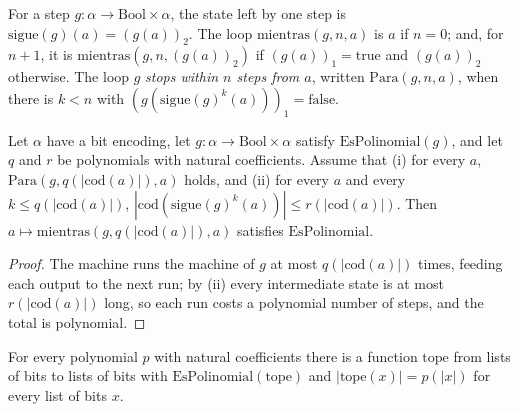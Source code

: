 \begin{definition}
  \label{def:machines-while}
  \leanok
  For a step $g : \alpha \to \mathrm{Bool} \times \alpha$, the state left by one step is
  $\mathrm{sigue}(g)(a) = (g(a))_2$. The loop $\mathrm{mientras}(g, n, a)$ is $a$ if $n = 0$; and, for
  $n + 1$, it is $\mathrm{mientras}(g, n, (g(a))_2)$ if $(g(a))_1 = \mathrm{true}$ and $(g(a))_2$ otherwise.
  The loop $g$ \emph{stops within $n$ steps from $a$}, written $\mathrm{Para}(g, n, a)$, when there is
  $k < n$ with $(g(\mathrm{sigue}(g)^k(a)))_1 = \mathrm{false}$.
  \own{}
  \infrastructure{}
\end{definition}

\begin{theorem}
  \label{thm:machines-while}
  \leanok
  Let $\alpha$ have a bit encoding, let $g : \alpha \to \mathrm{Bool} \times \alpha$ satisfy
  $\mathrm{EsPolinomial}(g)$, and let $q$ and $r$ be polynomials with natural coefficients. Assume that
  (i) for every $a$, $\mathrm{Para}(g, q(|\mathrm{cod}(a)|), a)$ holds, and (ii) for every $a$ and every
  $k \le q(|\mathrm{cod}(a)|)$, $|\mathrm{cod}(\mathrm{sigue}(g)^k(a))| \le r(|\mathrm{cod}(a)|)$. Then
  $a \mapsto \mathrm{mientras}(g, q(|\mathrm{cod}(a)|), a)$ satisfies $\mathrm{EsPolinomial}$.
  \own{}
  \infrastructure{}
\end{theorem}

\begin{proof}
  \leanok
  The machine runs the machine of $g$ at most $q(|\mathrm{cod}(a)|)$ times, feeding each output to the next
  run; by (ii) every intermediate state is at most $r(|\mathrm{cod}(a)|)$ long, so each run costs a
  polynomial number of steps, and the total is polynomial.
\end{proof}

\begin{theorem}
  \label{thm:machines-vara}
  \leanok
  For every polynomial $p$ with natural coefficients there is a function $\mathrm{tope}$ from lists of bits to
  lists of bits with $\mathrm{EsPolinomial}(\mathrm{tope})$ and $|\mathrm{tope}(x)| = p(|x|)$ for every
  list of bits $x$.
  \own{}
  \infrastructure{}
\end{theorem}

